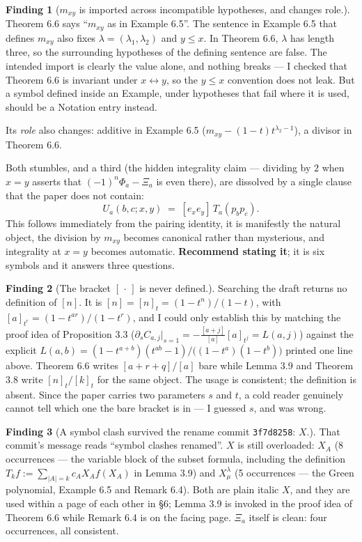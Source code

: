 \documentclass[11pt]{article}
\theoremstyle{definition}
\newtheorem{finding}{Finding}
\begin{document}
\begin{finding}[$m_{xy}$ is imported across incompatible hypotheses, and changes role.]
Theorem 6.6 says ``$m_{xy}$ as in Example 6.5''. The sentence in Example 6.5 that defines
$m_{xy}$ also fixes $\lambda=(\lambda_1,\lambda_2)$ and $y\le x$. In Theorem 6.6, $\lambda$
has length three, so the surrounding hypotheses of the defining sentence are false. The
intended import is clearly the value alone, and nothing breaks --- I checked that Theorem 6.6
is invariant under $x\leftrightarrow y$, so the $y\le x$ convention does not leak. But a
symbol defined inside an Example, under hypotheses that fail where it is used, should be a
Notation entry instead.

Its \emph{role} also changes: additive in Example 6.5
($m_{xy}-(1-t)t^{\lambda_2-1}$), a divisor in Theorem 6.6.

Both stumbles, and a third (the hidden integrality claim --- dividing by $2$ when $x=y$ asserts
that $(-1)^n\Phi_a-\Xi_a$ is even there), are dissolved by a single clause that the paper does
not contain:
\[
  U_a(b,c;x,y)\;=\;[e_xe_y]\,T_a(p_bp_c).
\]
This follows immediately from the pairing identity, it is manifestly the natural object, the
division by $m_{xy}$ becomes canonical rather than mysterious, and integrality at $x=y$ becomes
automatic. \textbf{Recommend stating it}; it is six symbols and it answers three questions.
\end{finding}

\begin{finding}[{The bracket $[\,\cdot\,]$ is never defined.}]
Searching the draft returns no definition of $[n]$. It is $[n]=[n]_t=(1-t^n)/(1-t)$, with
$[a]_{t^r}=(1-t^{ar})/(1-t^r)$, and I could only establish this by matching the proof idea of
Proposition 3.3 ($\partial_sC_{a,j}|_{s=1}=-\frac{[a+j]}{[a]}[a]_{t^j}=L(a,j)$) against the
explicit $L(a,b)=(1-t^{a+b})(t^{ab}-1)/\bigl((1-t^a)(1-t^b)\bigr)$ printed one line above.
Theorem 6.6 writes $[a+r+q]/[a]$ bare while Lemma 3.9 and Theorem 3.8 write $[n]_t/[k]_t$ for
the same object. The usage is consistent; the definition is absent. Since the paper carries two
parameters $s$ and $t$, a cold reader genuinely cannot tell which one the bare bracket is in
--- I guessed $s$, and was wrong.
\end{finding}

\begin{finding}[A symbol clash survived the rename commit \texttt{3f7d8258}: $X$.]
That commit's message reads ``symbol clashes renamed''. $X$ is still overloaded:
$X_A$ (8 occurrences --- the variable block of the subset formula, including the definition
$T_kf:=\sum_{|A|=k}c_AX_Af(X_A)$ in Lemma 3.9) and $X^\lambda_\mu$ (5 occurrences --- the Green
polynomial, Example 6.5 and Remark 6.4). Both are plain italic $X$, and they are used within a
page of each other in \S6; Lemma 3.9 is invoked in the proof idea of Theorem 6.6 while
Remark 6.4 is on the facing page. $\Xi_a$ itself is clean: four occurrences, all consistent.
\end{finding}
\end{document}
